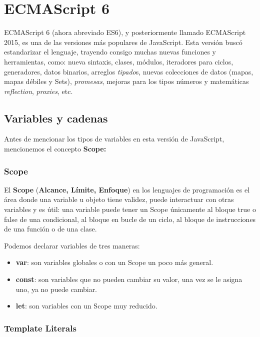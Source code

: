 \section{ECMAScript 6}

ECMAScript 6 (ahora abreviado ES6), y posteriormente llamado ECMAScript 2015, es una de las versiones más populares de JavaScript. Esta versión buscó estandarizar el lenguaje, trayendo consigo muchas nuevas funciones y herramientas, como: nueva sintaxis, clases, módulos, iteradores para ciclos, generadores, datos binarios, arreglos \textit{tipado}s, nuevas colecciones de datos (mapas, mapas débiles y Sets), \textit{promesas}, mejoras para los tipos números y matemáticas \textit{reflection}, \textit{proxies}, etc.


\subsection{Variables y cadenas}

Antes de mencionar los tipos de variables en esta versión de JavaScript, mencionemos el concepto \textbf{Scope:}


\subsubsection{Scope}

El \textbf{Scope} (\textbf{Alcance, Límite, Enfoque}) en los lenguajes de programación es el área donde una variable u objeto tiene validez, puede interactuar con otras variables y es útil: una variable puede tener un Scope únicamente al bloque true o false de una condicional, al bloque en bucle de un ciclo, al bloque de instrucciones de una función o de una clase.

Podemos declarar variables de tres maneras:
\begin{itemize}
    \item \textbf{var}: son variables globales o con un Scope un poco más general.
    \item \textbf{const}: son variables que no pueden cambiar su valor, una vez se le asigna uno, ya no puede cambiar.
    \item \textbf{let}: son variables con un Scope muy reducido.
\end{itemize}


\subsubsection{Template Literals}


